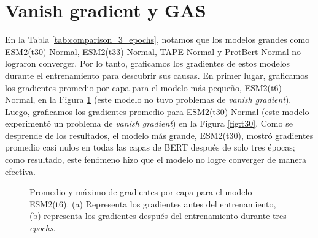 \section{Vanish gradient y GAS}

En la Tabla \ref{tab:comparison_3_epochs}, notamos que los modelos grandes como ESM2(t30)-Normal, ESM2(t33)-Normal, TAPE-Normal y ProtBert-Normal no lograron converger. Por lo tanto, graficamos los gradientes de estos modelos durante el entrenamiento para descubrir sus causas. En primer lugar, graficamos los gradientes promedio por capa para el modelo más pequeño, ESM2(t6)-Normal, en la Figura \ref{fig:t6} (este modelo no tuvo problemas de \textit{vanish gradient}). Luego, graficamos los gradientes promedio para ESM2(t30)-Normal (este modelo experimentó un problema de \textit{vanish gradient}) en la Figura \ref{fig:t30}. Como se desprende de los resultados, el modelo más grande, ESM2(t30), mostró gradientes promedio casi nulos en todas las capas de BERT después de solo tres épocas; como resultado, este fenómeno hizo que el modelo no logre converger de manera efectiva.

\begin{figure}[H]
	\centering
	

	\caption[Gradientes del modelo ESM2(t6)]{Promedio y máximo de gradientes por capa para el modelo ESM2(t6). (a) Representa los gradientes antes del entrenamiento, (b) representa los gradientes después del entrenamiento durante tres \textit{epochs}.}
	\label{fig:t6}
\end{figure}

